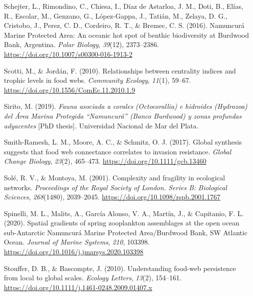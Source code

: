 \documentclass[preprint, 3p,
authoryear]{elsarticle} %
\newlength{\cslhangindent}
\newlength{\cslentryspacingunit} %
\newenvironment{CSLReferences}[2] %
 {%
  \setlength{\parindent}{0pt}
  \ifodd #1
  \let\oldpar\par
  \def\par{\hangindent=\cslhangindent\oldpar}
  \fi
  \setlength{\parskip}{#2\cslentryspacingunit}
 }%
 {}
\begin{document}
\begin{CSLReferences}{1}{0}
\leavevmode{}%
Schejter, L., Rimondino, C., Chiesa, I., Díaz de Astarloa, J. M., Doti,
B., Elías, R., Escolar, M., Genzano, G., López-Gappa, J., Tatián, M.,
Zelaya, D. G., Cristobo, J., Perez, C. D., Cordeiro, R. T., \& Bremec,
C. S. (2016). Namuncurá {Marine Protected Area}: An oceanic hot spot of
benthic biodiversity at {Burdwood Bank}, {Argentina}. \emph{Polar
Biology}, \emph{39}(12), 2373--2386.
\url{https://doi.org/10.1007/s00300-016-1913-2}

\leavevmode{}%
Scotti, M., \& Jordán, F. (2010). Relationships between centrality
indices and trophic levels in food webs. \emph{Community Ecology},
\emph{11}(1), 59--67. \url{https://doi.org/10.1556/ComEc.11.2010.1.9}

\leavevmode{}%
Sirito, M. (2019). \emph{Fauna asociada a corales ({Octocorallia}) e
hidroides ({Hydrozoa}) del {Área Marina Protegida} {``{Namuncurá}''}
({Banco Burdwood}) y zonas profundas adyacentes} {[}PhD thesis{]}.
Universidad Nacional de Mar del Plata.

\leavevmode{}%
Smith-Ramesh, L. M., Moore, A. C., \& Schmitz, O. J. (2017). Global
synthesis suggests that food web connectance correlates to invasion
resistance. \emph{Global Change Biology}, \emph{23}(2), 465--473.
\url{https://doi.org/10.1111/gcb.13460}

\leavevmode{}%
Solé, R. V., \& Montoya, M. (2001). Complexity and fragility in
ecological networks. \emph{Proceedings of the Royal Society of London.
Series B: Biological Sciences}, \emph{268}(1480), 2039--2045.
\url{https://doi.org/10.1098/rspb.2001.1767}

\leavevmode{}%
Spinelli, M. L., Malits, A., García Alonso, V. A., Martín, J., \&
Capitanio, F. L. (2020). Spatial gradients of spring zooplankton
assemblages at the open ocean sub-{Antarctic Namuncurá Marine Protected
Area}/{Burdwood Bank}, {SW Atlantic Ocean}. \emph{Journal of Marine
Systems}, \emph{210}, 103398.
\url{https://doi.org/10.1016/j.jmarsys.2020.103398}

\leavevmode{}%
Stouffer, D. B., \& Bascompte, J. (2010). Understanding food-web
persistence from local to global scales. \emph{Ecology Letters},
\emph{13}(2), 154--161.
\url{https://doi.org/10.1111/j.1461-0248.2009.01407.x}


\end{CSLReferences}
\end{document}
